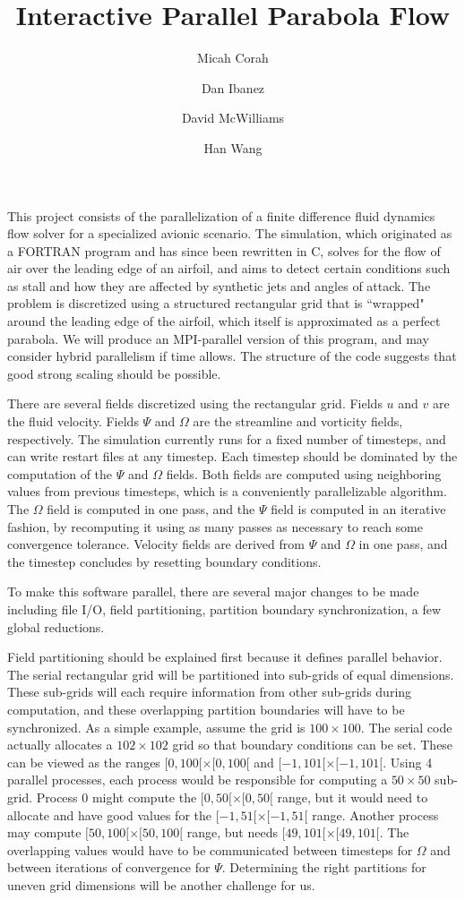 \documentclass{article}
\title{Interactive Parallel Parabola Flow}
\author{
Micah Corah
\and
Dan Ibanez
\and
David McWilliams
\and
Han Wang
}
\begin{document}
\maketitle

This project consists of the parallelization of
a finite difference fluid dynamics flow solver for a specialized
avionic scenario.
The simulation, which originated as a FORTRAN program and has since
been rewritten in C, solves for the flow of air over the leading
edge of an airfoil, and aims to detect certain conditions such
as stall and how they are affected by synthetic jets and angles
of attack.
The problem is discretized using a structured rectangular grid
that is ``wrapped" around the leading edge of the airfoil,
which itself is approximated as a perfect parabola.
We will produce an MPI-parallel version of this program,
and may consider hybrid parallelism if time allows.
The structure of the code suggests that good strong scaling
should be possible.

There are several fields discretized using the rectangular grid.
Fields $u$ and $v$ are the fluid velocity.
Fields $\Psi$ and $\Omega$ are the streamline and vorticity fields,
respectively.
The simulation currently runs for a fixed number of timesteps,
and can write restart files at any timestep.
Each timestep should be dominated by the computation of the $\Psi$
and $\Omega$ fields.
Both fields are computed using neighboring values from previous
timesteps, which is a conveniently parallelizable algorithm.
The $\Omega$ field is computed in one pass, and the $\Psi$ field
is computed in an iterative fashion, by recomputing it using
as many passes as necessary to reach some convergence tolerance.
Velocity fields are derived from $\Psi$ and $\Omega$ in one pass,
and the timestep concludes by resetting boundary conditions.

To make this software parallel, there are several major changes to
be made including file I/O, field partitioning, partition boundary
synchronization, a few global reductions.

Field partitioning should be explained first because it defines
parallel behavior.
The serial rectangular grid will be partitioned into sub-grids
of equal dimensions.
These sub-grids will each require information from other sub-grids
during computation, and these overlapping partition boundaries
will have to be synchronized.
As a simple example, assume the grid is $100\times 100$.
The serial code actually allocates a $102\times 102$ grid
so that boundary conditions can be set.
These can be viewed as the ranges $[0,100[\times[0,100[$
and $[-1,101[\times [-1,101[$.
Using 4 parallel processes, each process would be responsible for
computing a $50\times 50$ sub-grid.
Process 0 might compute the $[0,50[\times [0,50[$ range, but it
would need to allocate and have good values for the
$[-1,51[\times [-1,51[$ range.
Another process may compute $[50,100[\times [50,100[$ range,
but needs $[49,101[\times [49,101[$.
The overlapping values would have to be communicated between timesteps
for $\Omega$ and between iterations of convergence for $\Psi$.
Determining the right partitions for uneven grid dimensions
will be another challenge for us.
\end{document}
